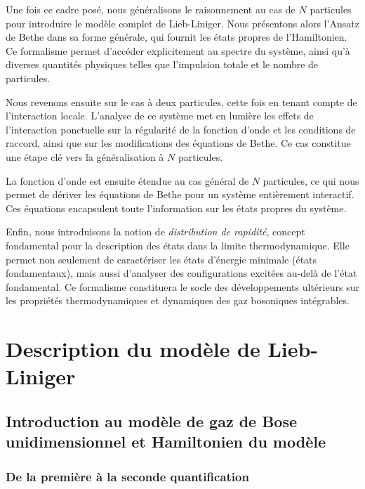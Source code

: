 \medskip

Une fois ce cadre posé, nous généralisons le raisonnement au cas de \(N\) particules pour introduire le modèle complet de Lieb-Liniger. Nous présentons alors l’Ansatz de Bethe dans sa forme générale, qui fournit les états propres de l’Hamiltonien. Ce formalisme permet d’accéder explicitement au spectre du système, ainsi qu’à diverses quantités physiques telles que l’impulsion totale et le nombre de particules.

\medskip

Nous revenons ensuite sur le cas à deux particules, cette fois en tenant compte de l’interaction locale. L’analyse de ce système met en lumière les effets de l’interaction ponctuelle sur la régularité de la fonction d’onde et les conditions de raccord, ainsi que sur les modifications des équations de Bethe. Ce cas constitue une étape clé vers la généralisation à \(N\) particules.

\medskip

La fonction d’onde est ensuite étendue au cas général de \(N\) particules, ce qui nous permet de dériver les équations de Bethe pour un système entièrement interactif. Ces équations encapsulent toute l’information sur les états propres du système.

\medskip

Enfin, nous introduisons la notion de \emph{distribution de rapidité}, concept fondamental pour la description des états dans la limite thermodynamique. Elle permet non seulement de caractériser les états d’énergie minimale (états fondamentaux), mais aussi d’analyser des configurations excitées au-delà de l’état fondamental. Ce formalisme constituera le socle des développements ultérieurs sur les propriétés thermodynamiques et dynamiques des gaz bosoniques intégrables.


\section{Description du modèle de Lieb-Liniger}

\subsection{Introduction au modèle de gaz de Bose unidimensionnel et Hamiltonien du modèle}

\subsubsection{De la première à la seconde quantification}

